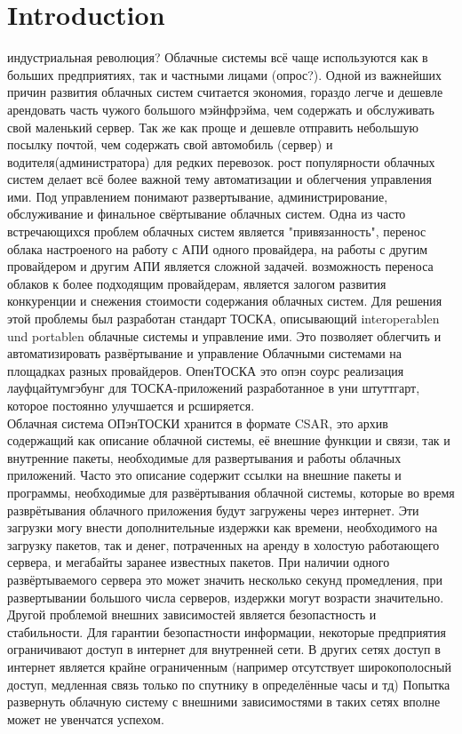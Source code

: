 
\chapter{Introduction}
индустриальная революция?
Облачные системы всё чаще используются как в больших предприятиях, так и частными лицами (опрос?).
Одной из важнейших причин развития облачных систем считается экономия, гораздо легче и дешевле арендовать часть чужого большого мэйнфрэйма, чем содержать и обслуживать свой маленький сервер. Так же как проще и дешевле отправить небольшую посылку почтой, чем содержать свой автомобиль (сервер) и водителя(администратора) для редких перевозок.
рост популярности облачных систем делает всё более важной тему автоматизации и облегчения управления ими.  Под управлением понимают развертывание, администрирование, обслуживание и финальное свёртывание облачных систем. Одна из часто встречающихся проблем облачных систем является "привязанность", перенос облака настроеного на работу с АПИ одного провайдера, на работы с другим провайдером и другим АПИ является сложной задачей. возможность переноса облаков к более подходящим провайдерам, является залогом развития конкуренции и снежения стоимости содержания облачных систем.
Для решения этой проблемы был разработан стандарт ТОСКА, описывающий  interoperablen und portablen облачные системы и управление ими. Это позволяет облегчить и автоматизировать развёртывание и управление Облачными системами на площадках разных провайдеров. 
ОпенТОСКА это опэн соурс реализация лауфцайтумгэбунг для ТОСКА-приложений разработанное в уни штуттгарт, которое постоянно улучшается и рсширяется.\\
Облачная система ОПэнТОСКИ хранится в формате CSAR, это архив содержащий как описание облачной системы, её внешние функции и связи, так и внутренние пакеты, необходимые для развертывания и работы облачных приложений. Часто это описание содержит ссылки на внешние пакеты и программы, необходимые для развёртывания облачной системы, которые во время разврётывания облачного приложения будут загружены через интернет. Эти загрузки могу внести дополнительные издержки как времени, необходимого на загрузку пакетов, так и денег, потраченных на аренду в холостую работающего сервера, и мегабайты заранее известных пакетов. При наличии одного развёртываемого сервера это может значить несколько секунд промедления, при развертывании большого числа серверов, издержки могут возрасти значительно.
Другой проблемой внешних зависимостей является безопастность и стабильности. Для гарантии безопастности информации, некоторые предприятия ограничивают доступ в интернет для внутренней сети. В других сетях доступ в интернет является крайне ограниченным (например отсутствует широкополосный доступ, медленная связь только по спутнику в определённые часы и тд) Попытка развернуть облачную систему с внешними зависимостями в таких сетях вполне может не увенчатся успехом.  \\
